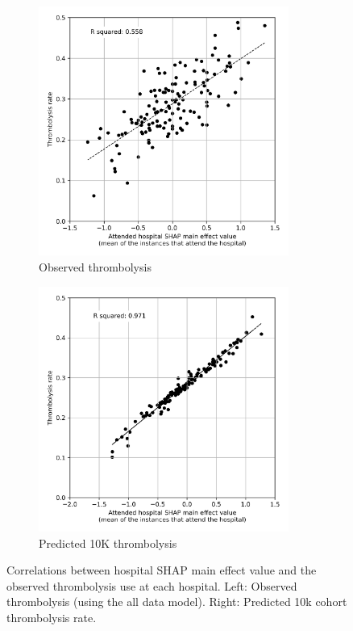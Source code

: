 \begin{figure}[!h]
\centering
\begin{subfigure}{.49\textwidth}
  \centering
    \caption*{\footnotesize{\textsf{Observed thrombolysis}}}
    \includegraphics[width=0.9\textwidth]{./images/03c_xgb_10_features_attended_hosp_shap_maineffect_vs_ivt_rate}
\end{subfigure}
\begin{subfigure}{.49\textwidth}
  \centering
    \caption*{\footnotesize{\textsf{Predicted 10K thrombolysis}}}
    \includegraphics[width=0.9\textwidth]{./images/04a_xgb_10_features_10k_cohort_attended_hosp_shap_maineffect_vs_ivt_rate}
\end{subfigure}

\caption{Correlations between hospital SHAP main effect value and the observed thrombolysis use at each hospital. Left: Observed thrombolysis (using the all data model). Right: Predicted 10k cohort thrombolysis rate.}
\label{fig:shap_correlation}
\end{figure}


